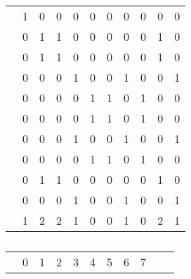 \documentclass[conference]{IEEEtran}
\begin{document}
\begin{table*}
\begin{subtable}[b]{0.45\linewidth}
\begin{tabular}{c|c|c|c|c|c|c|c|c|c|c|}
	{\color{red} } & {\color{red} 1} & {\color{red} 0} & {\color{red} 0} & {\color{red} 0} & {\color{red} 0} & {\color{red} 0} & {\color{red} 0} & {\color{red} 0} & {\color{red} 0} & {\color{red} 0} \\ \cline{2-11}
	{\color{red} } & {\color{red} 0} & {\color{red} 1} & {\color{red} 1} & {\color{red} 0} & {\color{red} 0} & {\color{red} 0} & {\color{red} 0} & {\color{red} 0} & {\color{red} 1} & {\color{red} 0} \\ \cline{2-11}
	{\color{red} } & {\color{red} 0} & {\color{red} 1} & {\color{red} 1} & {\color{red} 0} & {\color{red} 0} & {\color{red} 0} & {\color{red} 0} & {\color{red} 0} & {\color{red} 1} & {\color{red} 0} \\ \cline{2-11}
	 & 0 & 0 & 0 & 1 & 0 & 0 & 1 & 0 & 0 & 1 \\ \cline{2-11}
	 & 0 & 0 & 0 & 0 & 1 & 1 & 0 & 1 & 0 & 0 \\ \cline{2-11}
	 & 0 & 0 & 0 & 0 & 1 & 1 & 0 & 1 & 0 & 0 \\ \cline{2-11}
	{\color{red} } & {\color{red} 0} & {\color{red} 0} & {\color{red} 0} & {\color{red} 1} & {\color{red} 0} & {\color{red} 0} & {\color{red} 1} & {\color{red} 0} & {\color{red} 0} & {\color{red} 1} \\ \cline{2-11}
	 & 0 & 0 & 0 & 0 & 1 & 1 & 0 & 1 & 0 & 0 \\ \cline{2-11}
	 & 0 & 1 & 1 & 0 & 0 & 0 & 0 & 0 & 1 & 0 \\ \cline{2-11}
	 & 0 & 0 & 0 & 1 & 0 & 0 & 1 & 0 & 0 & 1 \\ \cline{2-11}
	\multicolumn{1}{c}{} & \multicolumn{1}{c}{{\color{blue}1}} & \multicolumn{1}{c}{{\color{blue}2}} & \multicolumn{1}{c}{{\color{blue}2}} & \multicolumn{1}{c}{{\color{blue}1}} & \multicolumn{1}{c}{{\color{blue}0}} & \multicolumn{1}{c}{{\color{blue}0}} & \multicolumn{1}{c}{{\color{blue}1}} & \multicolumn{1}{c}{{\color{blue}0}} & \multicolumn{1}{c}{{\color{blue}2}} & \multicolumn{1}{c}{{\color{blue}1}} \\
	\end{tabular}	
	\caption{}
	\label{table:mat3}
\end{subtable}
\hspace{2em}
\begin{subtable}[b]{0.45\linewidth}
	\begin{tabular}{c|c|c|c|c|c|c|c|c|c|c|}
	\multicolumn{1}{c}{}  &  \multicolumn{1}{c}{0} & \multicolumn{1}{c}{1} & 
	\multicolumn{1}{c}{2} &  \multicolumn{1}{c}{3} & \multicolumn{1}{c}{4} & 
	\multicolumn{1}{c}{5} &  \multicolumn{1}{c}{6} & \multicolumn{1}{c}{7} & 

\end{tabular}
\end{subtable}
\end{table*}
\end{document}
